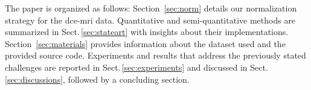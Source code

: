 The paper is organized as follows:
Section~\ref{sec:norm} details our normalization strategy for the \ac{dce}-\ac{mri} data.
Quantitative and semi-quantitative methods are summarized in Sect.\,\ref{sec:stateart} with insights about their implementations.
Section~\ref{sec:materials} provides information about the dataset
used and the provided source code.
Experiments and results that address the previously stated challenges
are reported in Sect.\,\ref{sec:experiments} and discussed in Sect.\,\ref{sec:discussions}, followed by a concluding section.

